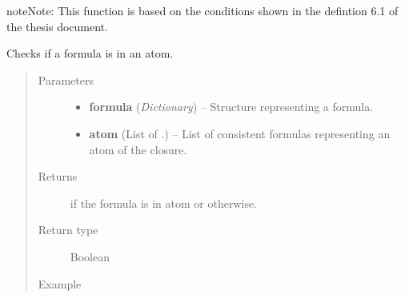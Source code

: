\documentclass[letterpaper,10pt,english]{sphinxmanual}
\begin{document}
\begin{fulllineitems}
\begin{notice}{note}{Note:}
This function is based on the conditions shown in the defintion 6.1 of the thesis document.
\end{notice}

\end{fulllineitems}


\begin{fulllineitems}
\label{modelCheckingGraph:modelCheckingGraph.isInAtom}
Checks if a formula is in an atom.
\begin{quote}\begin{description}
\item[{Parameters}] \leavevmode\begin{itemize}
\item {} 
\textbf{formula} (\emph{Dictionary}) -- Structure representing a formula.

\item {} 
\textbf{atom} (List of {\hyperref[formula:formula.Formula]{}}.) -- List of consistent formulas representing an atom of the closure.

\end{itemize}

\item[{Returns}] \leavevmode
{} if the formula is in atom or  otherwise.

\item[{Return type}] \leavevmode
Boolean

\item[{Example }] \leavevmode
\end{description}\end{quote}


\end{fulllineitems}
\end{document}
